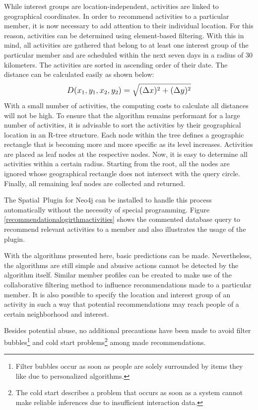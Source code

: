 \documentclass[12pt,numbers=noenddot,parskip,bibliography=totocnumbered,listof=totocnumbered,draft]{scrreprt}
\begin{document}
While interest groups are location-independent, activities are linked to geographical coordinates. In order to recommend activities to a particular member, it is now necessary to add attention to their individual location. For this reason, activities can be determined using element-based filtering. With this in mind, all activities are gathered that belong to at least one interest group of the particular member and are scheduled within the next seven days in a radius of 30 kilometers. The activities are sorted in ascending order of their date. The distance can be calculated easily as shown below:
\[
\mathlarger{D(x_1, y_1, x_2, y_2) = \sqrt{(\Delta x)^2+(\Delta y)^2}}
\]
With a small number of activities, the computing costs to calculate all distances will not be high. To ensure that the algorithm remains performant for a large number of activities, it is advisable to sort the activities by their geographical location in an R-tree structure. Each node within the tree defines a geographic rectangle that is becoming more and more specific as its level increases. Activities are placed as leaf nodes at the respective nodes. Now, it is easy to determine all activities within a certain radius. Starting from the root, all the nodes are ignored whose geographical rectangle does not intersect with the query circle. Finally, all remaining leaf nodes are collected and returned.

The \mbox{Spatial Plugin} \citep{spatial} for \mbox{Neo4j} can be installed to handle this process automatically without the necessity of special programming. Figure \ref{recommendationalogirthmactivities} shows the commented database query to recommend relevant activities to a member and also illustrates the usage of the plugin.

With the algorithms presented here, basic predictions can be made. Nevertheless, the algorithms are still simple and abusive actions cannot be detected by the algorithm itself. Similar member profiles can be created to make use of the collaborative filtering method to influence recommendations made to a particular member. It is also possible to specify the location and interest group of an activity in such a way that potential recommendations may reach people of a certain neighborhood and interest.

Besides potential abuse, no additional precautions have been made to avoid filter bubbles\footnote{Filter bubbles occur as soon as people are solely surrounded by items they like due to personalized algorithms.} and cold start problems\footnote{The cold start describes a problem that occurs as soon as a system cannot make reliable inferences due to insufficient interaction data.} among made recommendations.
\end{document}
